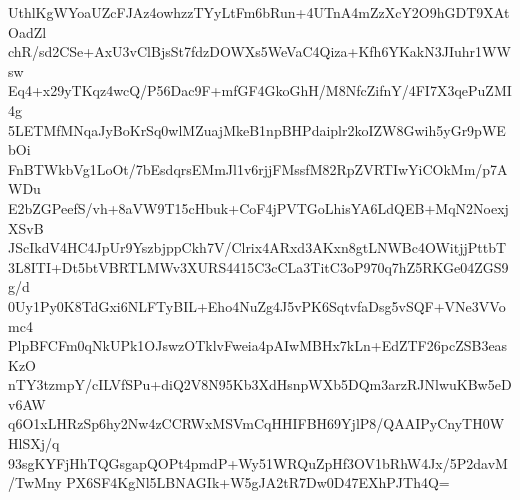 UthlKgWYoaUZcFJAz4owhzzTYyLtFm6bRun+4UTnA4mZzXcY2O9hGDT9XAtOadZl
chR/sd2CSe+AxU3vClBjsSt7fdzDOWXs5WeVaC4Qiza+Kfh6YKakN3JIuhr1WWsw
Eq4+x29yTKqz4wcQ/P56Dac9F+mfGF4GkoGhH/M8NfcZifnY/4FI7X3qePuZMI4g
5LETMfMNqaJyBoKrSq0wlMZuajMkeB1npBHPdaiplr2koIZW8Gwih5yGr9pWEbOi
FnBTWkbVg1LoOt/7bEsdqrsEMmJl1v6rjjFMssfM82RpZVRTIwYiCOkMm/p7AWDu
E2bZGPeefS/vh+8aVW9T15cHbuk+CoF4jPVTGoLhisYA6LdQEB+MqN2NoexjXSvB
JScIkdV4HC4JpUr9YszbjppCkh7V/Clrix4ARxd3AKxn8gtLNWBc4OWitjjPttbT
3L8ITI+Dt5btVBRTLMWv3XURS4415C3cCLa3TitC3oP970q7hZ5RKGe04ZGS9g/d
0Uy1Py0K8TdGxi6NLFTyBIL+Eho4NuZg4J5vPK6SqtvfaDsg5vSQF+VNe3VVomc4
PlpBFCFm0qNkUPk1OJswzOTklvFweia4pAIwMBHx7kLn+EdZTF26pcZSB3easKzO
nTY3tzmpY/cILVfSPu+diQ2V8N95Kb3XdHsnpWXb5DQm3arzRJNlwuKBw5eDv6AW
q6O1xLHRzSp6hy2Nw4zCCRWxMSVmCqHHIFBH69YjlP8/QAAIPyCnyTH0WHlSXj/q
93sgKYFjHhTQGsgapQOPt4pmdP+Wy51WRQuZpHf3OV1bRhW4Jx/5P2davM/TwMny
PX6SF4KgNl5LBNAGIk+W5gJA2tR7Dw0D47EXhPJTh4Q=
